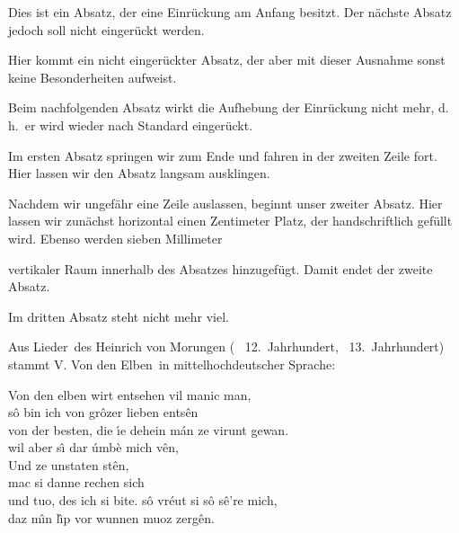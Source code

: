\documentclass[a4paper, 12pt]{article} %
\begin{document}
\hspace{\fill} Dies ist ein Absatz, der eine Einrückung am Anfang besitzt.
Der nächste Absatz jedoch soll nicht eingerückt werden.\par
Hier kommt ein nicht eingerückter Absatz, der aber mit
dieser Ausnahme sonst keine Besonderheiten aufweist.\par
\vfill
Beim nachfolgenden Absatz wirkt die Aufhebung der
Einrückung nicht mehr, d.\,h.\ er wird wieder nach
Standard eingerückt.\par

Im ersten Absatz springen wir \hfill zum Ende \linebreak
und fahren in der zweiten Zeile fort. Hier lassen wir den Absatz langsam 
ausklingen.\par\bigskip

Nachdem wir ungefähr eine Zeile auslassen, beginnt unser zweiter Absatz. Hier
lassen wir zunächst horizontal einen Zentimeter \hspace*{1cm} Platz, der
handschriftlich gefüllt wird. Ebenso werden sieben Millimeter\vspace{7mm}

vertikaler Raum innerhalb des Absatzes hinzugefügt. Damit endet der
zweite Absatz.\par

Im dritten Absatz steht nicht mehr viel.\par\bigskip


Aus \flqq Lieder\frqq\ des Heinrich von Morungen (\textasteriskcentered 
~12.~Jahrhundert, \textdagger ~13.~Jahrhundert) stammt \flqq V. Von den Elben\frqq\
in mittelhochdeutscher Sprache:\par\medskip\noindent
\glqq Von den elben wirt entsehen vil manic man,\\
\hspace*{2ex} s\^{o} bin ich von gr\^{o}zer lieben ents\^{e}n \\
von der besten, die \'{\i}e dehein m\'{a}n ze virunt gewan.\\
\hspace*{2ex} wil aber s\^{\i} dar \'{u}mb\`{e} mich v\^{e}n,\\
\hspace*{2ex} Und ze unstaten st\^{e}n,\\
\hspace*{4ex} mac si danne rechen sich\\
\hspace*{4ex} und tuo, des ich si bite. s\^{o} vr\'{e}ut si
s\^{o} s\^{e}\textquoteright re mich,\\
\hspace*{2ex} daz m\^{\i}n l\^{\i}p vor wunnen muoz zerg\^{e}n.\grqq\par\bigskip
\end{document}
